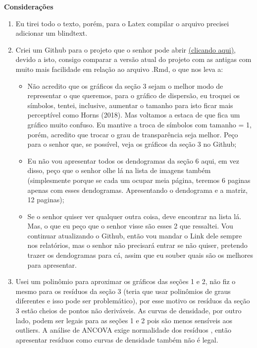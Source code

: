 \textbf{Considerações}
\begin{enumerate}

\item Eu tirei todo o texto, porém, para o Latex compilar o arquivo precisei adicionar um blindtext.

\item Criei um Github para o projeto que o senhor pode abrir \href{https://github.com/bfaria1/ProjWAV/blob/master/README.md}{(clicando aqui)}, devido a isto, consigo comparar a versão atual do projeto com as antigas com muito mais facilidade em relação ao arquivo .Rmd, o que nos leva a:
\begin{itemize}
    \item Não acredito que os gráficos da seção 3 sejam o melhor modo de representar o que queremos, para o gráfico de dispersão, eu troquei os símbolos, tentei, inclusive, aumentar o tamanho para isto ficar mais perceptível como Horns (2018). Mas voltamos a estaca de que fica um gráfico muito confuso. Eu mantive a troca de símbolos com tamanho = 1, porém, acredito que trocar o grau de transparência seja melhor. Peço para o senhor que, se possível, veja os gráficos da seção 3 no Github;
    \item Eu não vou apresentar todos os dendogramas da seção 6 aqui, em vez disso, peço que o senhor olhe lá na lista de imagens também (simplesmente porque se cada um ocupar meia página, teremos 6 paginas apenas com esses dendogramas. Apresentando o dendograma e a matriz, 12 paginas);
    \item Se o senhor quiser ver qualquer outra coisa, deve encontrar na lista lá. Mas, o que eu peço que o senhor visse são esses 2 que ressaltei. Vou continuar atualizando o Github, então vou mandar o Link dele sempre nos relatórios, mas o senhor não precisará entrar se não quiser, pretendo trazer os dendogramas para cá, assim que eu souber quais são os melhores para apresentar.
\end{itemize}

\item Usei um polinômio para aproximar os gráficos das seções 1 e 2, não fiz o mesmo para os resíduos da seção 3 (teria que usar polinômios de graus diferentes e isso pode ser problemático), por esse motivo os resíduos da seção 3 estão cheios de pontos não deriváveis. As curvas de densidade, por outro lado, podem ser legais para as seções 1 e 2 pois são menos sensíveis aos outliers. A análise de ANCOVA exige normalidade dos resíduos  \cite{Field2012}, então apresentar resíduos como curvas de densidade também não é legal.


\end{enumerate}

\color{white}

\cite{Horns2018}

\color{black}

\newpage

